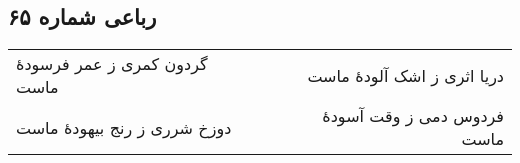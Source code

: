 \begin{center}
\section*{رباعی شماره ۶۵}
\label{sec:sh065}
\begin{longtable}{l p{0.5cm} r}
گردون کمری ز عمر فرسودهٔ ماست
&&
دریا اثری ز اشک آلودهٔ ماست
\\
دوزخ شرری ز رنج بیهودهٔ ماست
&&
فردوس دمی ز وقت آسودهٔ ماست
\\
\end{longtable}
\end{center}

